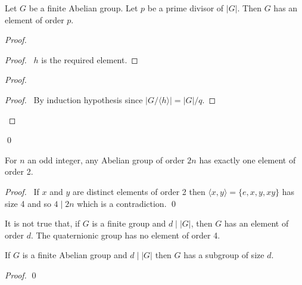 \begin{prop}
Let $G$ be a finite Abelian group. Let $p$ be a prime divisor of $|G|$. Then $G$ has an element of order $p$.
\end{prop}

\begin{proof}
\pf
{}
\begin{proof}
\pf\ $h$ is the required element.
\end{proof}
\begin{proof}
\begin{proof}
\pf\ By induction hypothesis since $|G / \langle h \rangle| = |G| / q$.
\end{proof}
\end{proof}
\qed
\end{proof}

\begin{cor}
For $n$ an odd integer, any Abelian group of order $2n$ has exactly one element of order 2.
\end{cor}

\begin{proof}
\pf\ If $x$ and $y$ are distinct elements of order 2 then $\langle x,y \rangle = \{ e, x, y, xy \}$ has size 4 and so $4 \mid 2n$ which is a contradiction. \qed
\end{proof}

\begin{ex}
It is not true that, if $G$ is a finite group and $d \mid |G|$, then $G$ has an element of order $d$. The quaternionic group has no element of order 4.
\end{ex}

\begin{prop}
If $G$ is a finite Abelian group and $d \mid |G|$ then $G$ has a subgroup of size $d$.
\end{prop}

\begin{proof}
\pf
{}
\qed
\end{proof}

